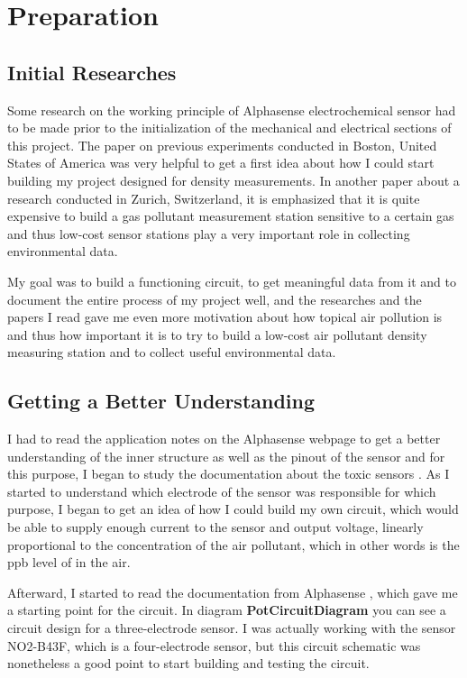 \chapter{Preparation}
\label{sec:firststeps}

\section{Initial Researches}
Some research on the working principle of Alphasense  electrochemical sensor had to be made prior to the initialization of the mechanical and electrical sections of this project. The paper \cite{Hutton2011} on previous experiments conducted in Boston, United States of America was very helpful to get a first idea about how I could start building my project designed for  density measurements. In another paper about a research conducted in Zurich, Switzerland, \cite{Mueller2017} it is emphasized that it is quite expensive to build a gas pollutant measurement station sensitive to a certain gas and thus low-cost sensor stations play a very important role in collecting environmental data. \par 
My goal was to build a functioning circuit, to get meaningful data from it and to document the entire process of my project well, and the researches and the papers I read gave me even more motivation about how topical air pollution is and thus how important it is to try to build a low-cost air pollutant density measuring station and to collect useful environmental data.

\section{Getting a Better Understanding}
I had to read the application notes on the Alphasense webpage to get a better understanding of the inner structure as well as the pinout of the sensor and for this purpose, I began to study the documentation about the toxic sensors \cite{HowElectrochemicalGasSensorsWork}. As I started to understand which electrode of the sensor was responsible for which purpose, I began to get an idea of how I could build my own circuit, which would be able to supply enough current to the sensor and output voltage, linearly proportional to the concentration of the air pollutant, which in other words is the ppb level of  in the air. \par
Afterward, I started to read the documentation from Alphasense \cite{2009}, which gave me a starting point for the circuit. In diagram \textbf{PotCircuitDiagram} you can see a circuit design for a three-electrode sensor. I was actually working with the sensor NO2-B43F, which is a four-electrode sensor, but this circuit schematic was nonetheless a good point to start building and testing the circuit.

